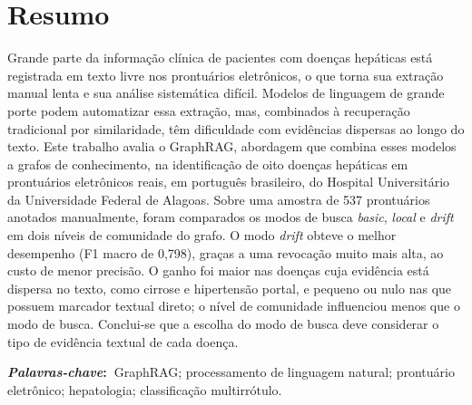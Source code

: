 \chapter*{Resumo}
\noindent Grande parte da informação clínica de pacientes com doenças hepáticas está registrada em texto livre nos prontuários eletrônicos, o que torna sua extração manual lenta e sua análise sistemática difícil. Modelos de linguagem de grande porte podem automatizar essa extração, mas, combinados à recuperação tradicional por similaridade, têm dificuldade com evidências dispersas ao longo do texto. Este trabalho avalia o GraphRAG, abordagem que combina esses modelos a grafos de conhecimento, na identificação de oito doenças hepáticas em prontuários eletrônicos reais, em português brasileiro, do Hospital Universitário da Universidade Federal de Alagoas. Sobre uma amostra de 537 prontuários anotados manualmente, foram comparados os modos de busca \textit{basic}, \textit{local} e \textit{drift} em dois níveis de comunidade do grafo. O modo \textit{drift} obteve o melhor desempenho (F1 macro de 0,798), graças a uma revocação muito mais alta, ao custo de menor precisão. O ganho foi maior nas doenças cuja evidência está dispersa no texto, como cirrose e hipertensão portal, e pequeno ou nulo nas que possuem marcador textual direto; o nível de comunidade influenciou menos que o modo de busca. Conclui-se que a escolha do modo de busca deve considerar o tipo de evidência textual de cada doença.

\vspace{5mm}
\noindent\textbf{\textit{Palavras-chave}:~}GraphRAG; processamento de linguagem natural; prontuário eletrônico; hepatologia; classificação multirrótulo.
